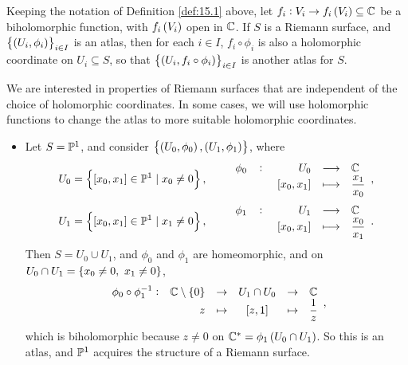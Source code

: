 \begin{remark}
Keeping the notation of Definition \ref{def:15.1} above, let $ f_i : V_i \to f_i\br{V_i} \subseteq \C $ be a biholomorphic function, with $ f_i\br{V_i} $ open in $ \C $. If $ S $ is a Riemann surface, and $ \cbr{\br{U_i, \phi_i}}_{i \in I} $ is an atlas, then for each $ i \in I $, $ f_i \circ \phi_i $ is also a holomorphic coordinate on $ U_i \subseteq S $, so that $ \cbr{\br{U_i, f_i \circ \phi_i}}_{i \in I} $ is another atlas for $ S $.
\end{remark}

We are interested in properties of Riemann surfaces that are independent of the choice of holomorphic coordinates. In some cases, we will use holomorphic functions to change the atlas to more suitable holomorphic coordinates.

\begin{example}
\hfill
\begin{itemize}
\item Let $ S = \P^1 $, and consider $ \cbr{\br{U_0, \phi_0}, \br{U_1, \phi_1}} $, where
$$ U_0 = \cbr{\sbr{x_0, x_1} \in \P^1 \mid x_0 \ne 0}, \qquad \function[\phi_0]{U_0}{\C}{\sbr{x_0, x_1}}{\dfrac{x_1}{x_0}}, $$
$$ U_1 = \cbr{\sbr{x_0, x_1} \in \P^1 \mid x_1 \ne 0}, \qquad \function[\phi_1]{U_1}{\C}{\sbr{x_0, x_1}}{\dfrac{x_0}{x_1}}. $$
Then $ S = U_0 \cup U_1 $, and $ \phi_0 $ and $ \phi_1 $ are homeomorphic, and on $ U_0 \cap U_1 = \cbr{x_0 \ne 0, \ x_1 \ne 0} $,
$$
\begin{array}{crcccl}
\phi_0 \circ \phi_1^{-1} : & \C \setminus \cbr{0} & \to & U_1 \cap U_0 & \to & \C \\
& z & \mapsto & \sbr{z, 1} & \mapsto & \dfrac{1}{z}
\end{array},
$$
which is biholomorphic because $ z \ne 0 $ on $ \C^* = \phi_1\br{U_0 \cap U_1} $. So this is an atlas, and $ \P^1 $ acquires the structure of a Riemann surface.

\pagebreak



\end{itemize}
\end{example}
